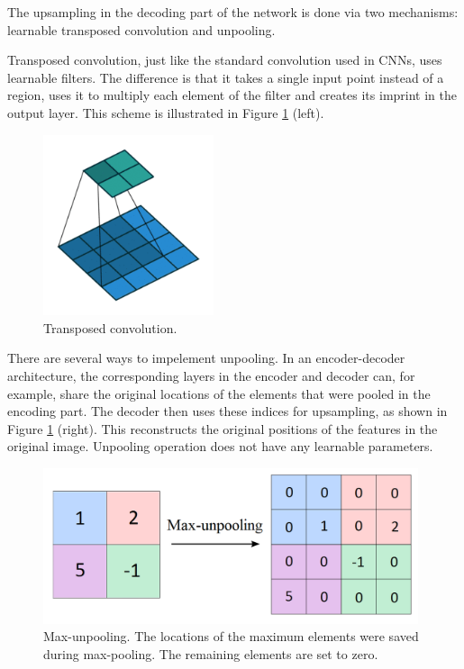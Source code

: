 The upsampling in the decoding part of the network is done via two mechanisms: learnable transposed convolution and unpooling. 

Transposed convolution, just like the standard convolution used in CNNs, uses learnable filters. The difference is that it takes a single input point instead of a region, uses it to multiply each element of the filter and creates its imprint in the output layer. This scheme is illustrated in Figure \ref{transposed} (left). \cite{stanford-L11}

\vspace{4mm}
\begin{figure}[h]
	\begin{center}
		\includegraphics*[width=5cm, keepaspectratio]{obr/transposed.png}
	\end{center}
	\vspace{4mm}
	\caption{Transposed convolution. \cite{theano}} 
	\label{transposed}
\end{figure}

There are several ways to impelement unpooling. In an encoder-decoder architecture, the corresponding layers in the encoder and decoder can, for example, share the original locations of the elements that were pooled in the encoding part. The decoder then uses these indices for upsampling, as shown in Figure \ref{transposed} (right). This reconstructs the original positions of the features in the original image. Unpooling operation does not have any learnable parameters. \cite{segnet} \cite{stanford-L11}

\vspace{4mm}
\begin{figure}[h]
	\begin{center}
		\includegraphics*[width=11cm, keepaspectratio]{obr/unpool.png}
	\end{center}
	\vspace{4mm}
	\caption{Max-unpooling. The locations of the maximum elements were saved during max-pooling. The remaining elements are set to zero.} 
	\label{unpool}
\end{figure}

